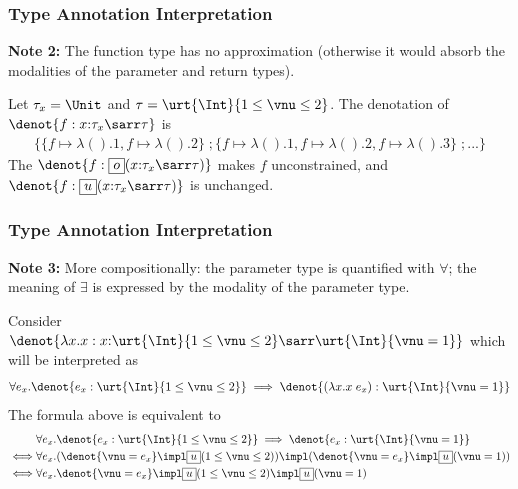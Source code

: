 \begin{frame}[fragile]
    \frametitle{Type Annotation Interpretation}

\textbf{Note 2:} The function type has no approximation (otherwise it would absorb the modalities of the parameter and return types).

\begin{example} Let $\tau_x = \Unit$ and $\tau = \urt{\Int}{1 \leq \vnu \leq 2}$. The denotation of $\denot{f : x{:}\tau_x \sarr \tau}$ is
    \begin{align*}
        \{ \{f \mapsto \lambda ().1, f\mapsto\lambda ().2\} \;; \{f \mapsto \lambda ().1, f\mapsto\lambda ().2 , f\mapsto\lambda ().3\} \;; ... \}
    \end{align*}
The $\denot{f : \subExt (x{:}\tau_x \sarr \tau)}$ makes $f$ unconstrained, and $\denot{f : \supExt (x{:}\tau_x \sarr \tau)}$ is unchanged.
 \end{example}

\end{frame}

\begin{frame}[fragile]
    \frametitle{Type Annotation Interpretation}

\textbf{Note 3:} More compositionally: the parameter type is quantified with $\forall$; the meaning of $\exists$ is expressed by the modality of the parameter type.

\begin{example} Consider $\denot{\lambda x.x : x{:}\urt{\Int}{1 \leq \vnu \leq 2} \sarr \urt{\Int}{\vnu = 1}}$ which will be interpreted as
\begin{align*}
    \forall e_x. \denot{e_x : \urt{\Int}{1 \leq \vnu \leq 2}} \implies \denot{(\lambda x.x\;e_x) : \urt{\Int}{\vnu = 1}}
\end{align*}
The formula above is equivalent to
\begin{align*}
    &\forall e_x. \denot{e_x : \urt{\Int}{1 \leq \vnu \leq 2}} \implies \denot{e_x : \urt{\Int}{\vnu = 1}}
    \\\iff&\forall e_x. (\denot{\vnu = e_x} \impl \supExt (1 \leq \vnu \leq 2)) \impl (\denot{\vnu = e_x} \impl \supExt (\vnu = 1))
    \\\iff&\forall e_x. \denot{\vnu = e_x} \impl \supExt (1 \leq \vnu \leq 2)\impl \supExt (\vnu = 1)
\end{align*}
 \end{example}

\end{frame}

